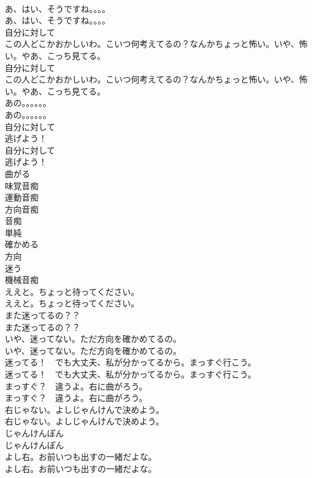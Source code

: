 \documentclass[8pt]{extreport}
\begin{document}
\begin{CJK}{UTF8}{min}
\\	あ、はい、そうですね。。。。	
\\	あ、はい、そうですね。。。。 
\\	自分に対して
\\	この人どこかおかしいわ。こいつ何考えてるの？なんかちょっと怖い。いや、怖い。やあ、こっち見てる。	
\\	自分に対して
\\	この人どこかおかしいわ。こいつ何考えてるの？なんかちょっと怖い。いや、怖い。やあ、こっち見てる。 
\\	あの。。。。。。	
\\	あの。。。。。。 
\\	自分に対して
\\	逃げよう！	
\\	自分に対して
\\	逃げよう！ 
\\	曲がる
\\	味覚音痴
\\	運動音痴
\\	方向音痴
\\	音痴
\\	単純
\\	確かめる
\\	方向
\\	迷う
\\	機械音痴
\\	ええと。ちょっと待ってください。	
\\	ええと。ちょっと待ってください。 
\\	また迷ってるの？？	
\\	また迷ってるの？？ 
\\	いや、迷ってない。ただ方向を確かめてるの。	
\\	いや、迷ってない。ただ方向を確かめてるの。 
\\	迷ってる！　でも大丈夫、私が分かってるから。まっすぐ行こう。	
\\	迷ってる！　でも大丈夫、私が分かってるから。まっすぐ行こう。 
\\	まっすぐ？　違うよ。右に曲がろう。	
\\	まっすぐ？　違うよ。右に曲がろう。 
\\	右じゃない。よしじゃんけんで決めよう。	
\\	右じゃない。よしじゃんけんで決めよう。 
\\	じゃんけんぽん	
\\	じゃんけんぽん 
\\	よし右。お前いつも出すの一緒だよな。	
\\	よし右。お前いつも出すの一緒だよな。 

\end{CJK}
\end{document}
